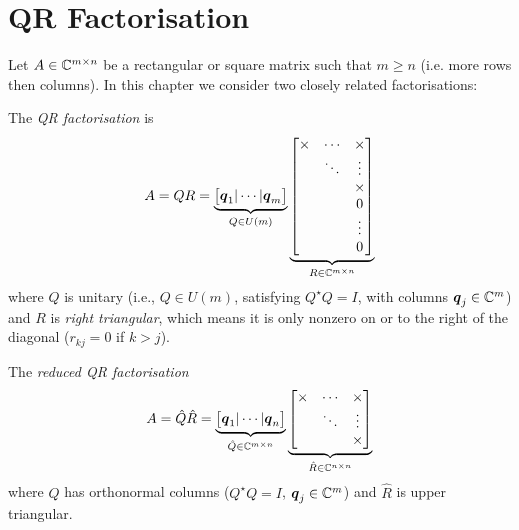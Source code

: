 
\section{QR Factorisation}
Let $A \in {\mathbb C}^{m \times n}$ be a rectangular or square matrix such that $m \ensuremath{\geq} n$ (i.e. more rows then columns). In this chapter we consider two closely related factorisations:

\begin{definition}[QR factorisation] The \emph{QR factorisation} is
\[
A = Q R = \underbrace{\begin{bmatrix} \ensuremath{\bm{\q}}_1 | \ensuremath{\cdots} | \ensuremath{\bm{\q}}_m \end{bmatrix}}_{Q \ensuremath{\in} U(m)} \underbrace{\begin{bmatrix} \ensuremath{\times} & \ensuremath{\cdots} & \ensuremath{\times} \\ & \ensuremath{\ddots} & \ensuremath{\vdots} \\ && \ensuremath{\times} \\ &&0 \\ &&\ensuremath{\vdots} \\ && 0 \end{bmatrix}}_{R \ensuremath{\in} \ensuremath{\bbC}^{m \ensuremath{\times} n}}
\]
where $Q$ is unitary (i.e., $Q \ensuremath{\in} U(m)$, satisfying $Q^\ensuremath{\star}Q = I$, with columns $\bm{{\mbox{\boldmath$q$\unboldmath}}}_j \in {\mathbb C}^m$) and $R$ is \emph{right triangular}, which means it  is only nonzero on or to the right of the diagonal ($r_{kj} = 0$ if $k > j$). \end{definition}

\begin{definition} The \emph{reduced QR factorisation}
\[
A = \hat Q \hat R = \underbrace{\begin{bmatrix} \ensuremath{\bm{\q}}_1 | \ensuremath{\cdots} | \ensuremath{\bm{\q}}_n \end{bmatrix}}_{ \hat Q \ensuremath{\in} \ensuremath{\bbC}^{m \ensuremath{\times} n}} \underbrace{\begin{bmatrix} \ensuremath{\times} & \ensuremath{\cdots} & \ensuremath{\times} \\ & \ensuremath{\ddots} & \ensuremath{\vdots} \\ && \ensuremath{\times}  \end{bmatrix}}_{\hat R \ensuremath{\in} \ensuremath{\bbC}^{n \ensuremath{\times} n}}
\]
where $Q$ has orthonormal columns ($Q^\ensuremath{\star} Q = I$, $\bm{{\mbox{\boldmath$q$\unboldmath}}}_j \in {\mathbb C}^m$) and $\hat R$ is upper triangular. \end{definition}

